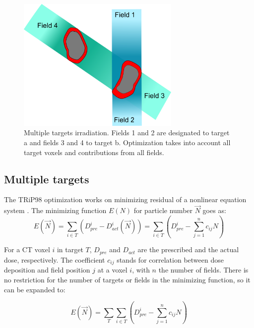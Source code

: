 \newpage

\begin{figure}[H]
	\begin{center}
		\includegraphics[width=0.7\textwidth]{./ComplexPatients/Images/multiTarget.png}
		\caption{Multiple targets irradiation. Fields 1 and 2 are designated to target a and fields 3 and 4 to target b. Optimization takes into account all target voxels and contributions from all fields.}
		\label{Fig:multiTargets}
	\end{center}
\end{figure}

\subsection{Multiple targets}

The TRiP98 optimization works on minimizing residual of a nonlinear equation system \cite{Kraemer2000a}. The minimizing function $E(N)$ for particle number $\vec{N}$ goes as:
\begin{equation}
\label{eq-costFunc}
 E(\vec{N}) = \sum_{i\in T} \left( D_{pre}^{i} - D_{act}^{i}(\vec{N})\right) = \sum_{i\in T} \left( D_{pre}^{i} -\sum_{j=1}^n c_{ij}N\right)
\end{equation}

For a CT voxel $i$ in target $T$, $ D_{pre}$ and $D_{act}$ are the prescribed and the actual dose, respectively. The coefficient $c_{ij}$ stands for correlation between dose deposition and field position $j$ at a voxel $i$, 
with $n$ the number of fields. There is no restriction for the number of targets or fields in the minimizing function, so it can be expanded to:

\begin{equation}
\label{eq-multiCost}
 E(\vec{N}) = \sum_{T} \sum_{i\in T} \left( D_{pre}^{i} -\sum_{j=1}^n c_{ij}N\right)
\end{equation}

